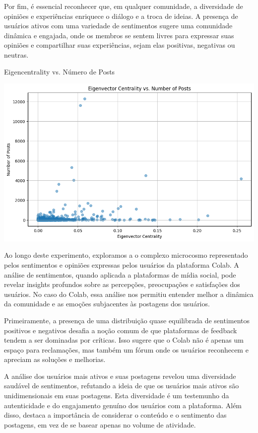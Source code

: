 Por fim, é essencial reconhecer que, em qualquer comunidade, a diversidade de opiniões e experiências enriquece o diálogo e a troca de ideias. A presença de usuários ativos com uma variedade de sentimentos sugere uma comunidade dinâmica e engajada, onde os membros se sentem livres para expressar suas opiniões e compartilhar suas experiências, sejam elas positivas, negativas ou neutras.

\begin{quadro}[!htb]
	\caption{Eigencentrality vs. Número de Posts}
	\label{fig:eigencentrality_vs_number_of_posts}
	\centering
	\includegraphics[scale=0.70]{images/eigencentrality_vs_number_of_posts.png}
	\fautor
\end{quadro}

Ao longo deste experimento, exploramos a o complexo microcosmo representado pelos sentimentos e opiniões expressas pelos usuários da plataforma Colab. A análise de sentimentos, quando aplicada a plataformas de mídia social, pode revelar insights profundos sobre as percepções, preocupações e satisfações dos usuários. No caso do Colab, essa análise nos permitiu entender melhor a dinâmica da comunidade e as emoções subjacentes às postagens dos usuários.

Primeiramente, a presença de uma distribuição quase equilibrada de sentimentos positivos e negativos desafia a noção comum de que plataformas de feedback tendem a ser dominadas por críticas. Isso sugere que o Colab não é apenas um espaço para reclamações, mas também um fórum onde os usuários reconhecem e apreciam as soluções e melhorias.

A análise dos usuários mais ativos e suas postagens revelou uma diversidade saudável de sentimentos, refutando a ideia de que os usuários mais ativos são unidimensionais em suas postagens. Esta diversidade é um testemunho da autenticidade e do engajamento genuíno dos usuários com a plataforma. Além disso, destaca a importância de considerar o conteúdo e o sentimento das postagens, em vez de se basear apenas no volume de atividade.

